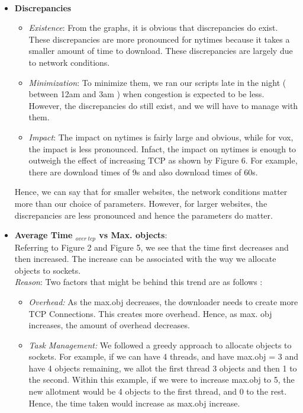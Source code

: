 \documentclass[12pt]{article}
\begin{document}
~
\begin{itemize}
\item \textbf{Discrepancies}
\begin{itemize}
\item \textit{Existence}: From the graphs, it is obvious that discrepancies do exist. These discrepancies are more pronounced for nytimes because it takes a smaller amount of time to download. These discrepancies are largely due to network conditions. 
\item \textit{Minimization}: To minimize them, we ran our scripts late in the night ( between 12am and 3am ) when congestion is expected to be less. However, the discrepancies do still exist, and we will have to manage with them. 
\item \textit{Impact}: The impact on nytimes is fairly large and obvious, while for vox, the impact is less pronounced. Infact, the impact on nytimes is enough to outweigh the effect of increasing TCP as shown by Figure 6. For example, there are download times of 9s and also download times of 60s.
\end{itemize}
Hence, we can say that for smaller websites, the network conditions matter more than our choice of parameters. However, for larger websites, the discrepancies are less pronounced and hence the parameters do matter.
\item \textbf{Average Time $_{over\ tcp}$ vs Max. objects}:\\ Referring to Figure 2 and Figure 5, we see that the time first decreases and then increased. The increase can be associated with the way we allocate objects to sockets.
\\ \textit{Reason}: Two factors that might be behind this trend are as follows : \begin{itemize}
\item \emph{Overhead:} As the max.obj decreases, the downloader needs to create more TCP Connections. This creates more overhead. Hence, as max. obj increases, the amount of overhead decreases.
\item \emph{Task Management:} We followed a greedy approach to allocate objects to sockets. For example, if we can have 4 threads, and have max.obj = 3 and have 4 objects remaining, we allot the first thread 3 objects and then 1 to the second. Within this example, if we were to increase max.obj to 5, the new allotment would be 4 objects to the first thread, and 0 to the rest. Hence, the time taken would increase as max.obj increase. 
\end{itemize}

\end{itemize}
\end{document}
